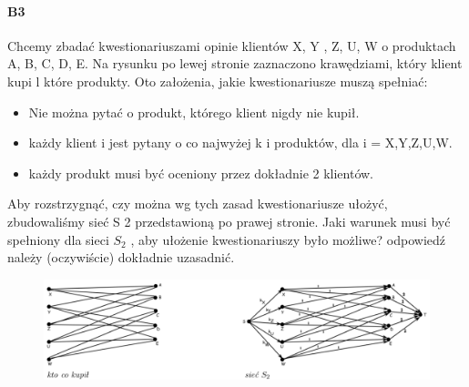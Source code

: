 \paragraph{B3} Chcemy zbadać kwestionariuszami opinie klientów X, Y , Z, U, W o produktach A, B, C, D, E. Na rysunku po lewej stronie zaznaczono krawędziami, który klient kupi l które produkty. Oto założenia, jakie kwestionariusze muszą spełniać:
\begin{itemize}
\item Nie można pytać o produkt, którego klient nigdy nie kupił.
\item każdy klient i jest pytany o co najwyżej k i produktów, dla i = X,Y,Z,U,W.
\item każdy produkt musi być oceniony przez dokładnie 2 klientów.
\end{itemize}
Aby rozstrzygnąć, czy można wg tych zasad kwestionariusze ułożyć, zbudowaliśmy sieć S 2 przedstawioną po prawej stronie. Jaki warunek musi być spełniony dla sieci $S_2$ , aby ułożenie kwestionariuszy było możliwe? odpowiedź należy (oczywiście) dokładnie uzasadnić.
\begin{figure}[H]
\centering
\includegraphics[width=.9\textwidth]{img/7_B3}
\end{figure}


